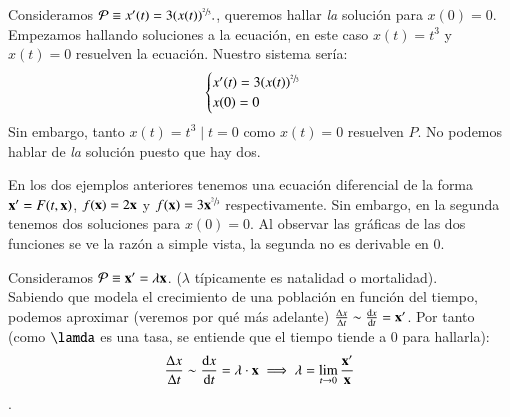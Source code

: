 \begin{eg}
    Consideramos $\mathcal{P} \equiv x'(t) = 3(x(t))^{\sfrac{2}{3}}.$, queremos hallar \textit{la} solución para $x(0)=0$.\\
    Empezamos hallando soluciones a la ecuación, en este caso $x(t) = t^3$ y $x(t) = 0$ resuelven la ecuación. Nuestro sistema sería:
    $$
        \begin{cases}
            x'(t) = 3(x(t))^{\sfrac{2}{3}} \\ x(0) = 0
        \end{cases}
    $$
    Sin embargo, tanto $x(t) = t^3 \mid t = 0$ como $x(t) = 0$ resuelven $P$. No podemos hablar de \textit{la} solución puesto que hay dos.
\end{eg}

En los dos ejemplos anteriores tenemos una ecuación diferencial de la forma $\mathbf{x'} = F(t, \mathbf{x})$, $f(\mathbf{x}) = 2\mathbf{x}$ y $f(\mathbf{x}) = 3\mathbf{x}^{\sfrac{2}{3}}$ respectivamente. Sin embargo, en la segunda tenemos dos soluciones para $x(0) = 0$. Al observar las gráficas de las dos funciones se ve la razón a simple vista, la segunda no es derivable en $0$.
\begin{center}
\end{center}

\begin{eg}
    Consideramos $\mathcal{P} \equiv \mathbf{x'} = \lambda \mathbf{x}$. ($\lambda$ típicamente es natalidad o mortalidad).\\
    Sabiendo que modela el crecimiento de una población en función del tiempo, podemos aproximar (veremos por qué más adelante)
    $\frac{\Delta x}{\Delta t} \sim \frac{\mathrm{d}x}{\mathrm{d}t} = \mathbf{x'}$. Por tanto (como $\lamda$ es una tasa, se entiende que el tiempo tiende a 0 para hallarla):
    $$ \frac{\Delta x}{\Delta t}\sim \frac{\mathrm{d}x}{\mathrm{d}t} = \lambda \cdot \mathbf{x} \implies \lambda = \lim_{t \to 0} \frac{\mathbf{x'}}{\mathbf{x}}$$.
\end{eg}

